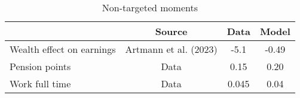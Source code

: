 \begin{table}[htbp]\caption{Non-targeted moments}\label{table:nontargeted_moments}\centering\footnotesize\begin{tabular}{lccc} \toprule  &  Source& Data & Model  \\\midrule    Wealth effect on earnings      & Artmann et al. (2023)          & -5.1 &-0.49\\ Pension points                & Data                           & 0.15 &0.20\\ Work full time              & Data                             & 0.045 &0.04\\  \bottomrule\end{tabular}\end{table}